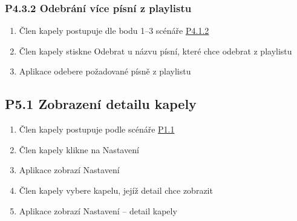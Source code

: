 \subsubsection{P4.3.2 Odebrání více písní z playlistu}
\label{P4.3.2}

\begin{enumerate}
    \item Člen kapely postupuje dle bodu 1--3 scénáře \hyperref[P4.1.2]{P4.1.2}
    \item Člen kapely stiskne Odebrat u názvu písní, které chce odebrat z playlistu
    \item Aplikace odebere požadované písně z playlistu
\end{enumerate}

\subsection{P5.1 Zobrazení detailu kapely}
\label{P5.1}

\begin{enumerate}
    \item Člen kapely postupuje podle scénáře \hyperref[P1.1]{P1.1}
    \item Člen kapely klikne na Nastavení
    \item Aplikace zobrazí Nastavení
    \item Člen kapely vybere kapelu, jejíž detail chce zobrazit
    \item Aplikace zobrazí Nastavení -- detail kapely
\end{enumerate}

